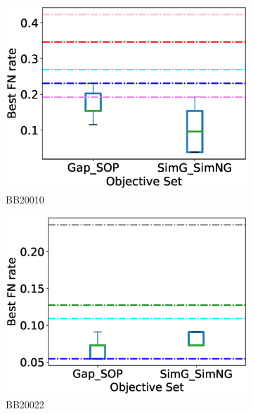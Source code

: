 \begin{figure}[!htbp]
\begin{adjustwidth}{-1cm}{-1cm}
\begin{subfigure}{0.22\textwidth}
			\includegraphics[width=\columnwidth]{Figure/summary/precomputedInit/Balibase/BB20010_objset_fnrate_rank}
			\caption{BB20010}
		\end{subfigure}
		\begin{subfigure}{0.22\textwidth}
			\includegraphics[width=\columnwidth]{Figure/summary/precomputedInit/Balibase/BB20022_objset_fnrate_rank}
			\caption{BB20022}
		\end{subfigure}
		\begin{subfigure}{0.22\textwidth}

\end{subfigure}
\end{adjustwidth}
\end{figure}
